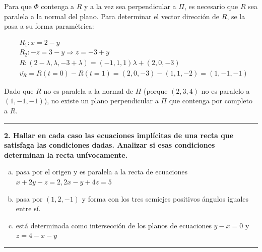\documentclass{article}
\begin{document}
\begin{enumerate}[a)]
Para que $\Phi$ contenga a $R$ y a la vez sea perpendicular a $\Pi$, es necesario que $R$ sea paralela a la normal del plano. Para determinar el vector dirección de $R$, se la pasa a su forma paramétrica:

\begin{subequations}
\begin{align}
& R_1: x = 2 - y \\
& R_2: -z = 3 - y \Rightarrow z = -3 + y \\
& R: (2-\lambda, \lambda, -3+\lambda) = (-1, 1, 1) \lambda + (2, 0, -3) \\
& \overline{v_R} = R(t=0) - R(t=1) = (2, 0, -3) - (1, 1, -2) = (1, -1, -1)
\end{align}
\end{subequations}

Dado que $R$ no es paralela a la normal de $\Pi$ (porque $(2, 3, 4)$ no es paralelo a $(1, -1, -1)$), no existe un plano perpendicular a $\Pi$ que contenga por completo a $R$. 

\end{enumerate}

\hrule
\vspace{10 pt}
\textbf{2. Hallar en cada caso las ecuaciones implícitas de una recta que satisfaga las condiciones dadas. Analizar si esas condiciones determinan la recta unívocamente.} 

\begin{enumerate}[(a)]
\bfseries
\item pasa por el origen y es paralela a la recta de ecuaciones $x + 2y -z = 2, 2x - y + 4z = 5$

\item pasa por $(1, 2, -1)$ y forma con los tres semiejes positivos ángulos iguales entre sí.

\item está determinada como intersección de los planos de ecuaciones $y-x = 0$ y $z = 4 - x - y$
\end{enumerate}
\hrule
\end{document}
